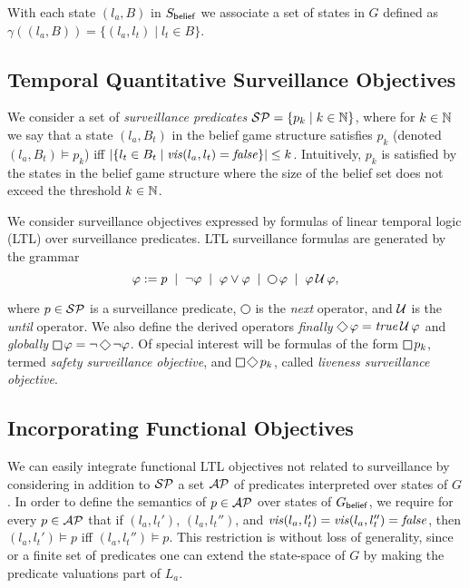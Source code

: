  
\begin{example}
\end{example}


With each state $(l_a,B)$ in $S_{\mathsf{belief}}$ we associate a set of states in $G$ defined as $\gamma((l_a,B)) = \{(l_a,l_t) \mid l_t \in B\}$.

\subsection{Temporal Quantitative Surveillance Objectives}

We consider a set of \emph{surveillance predicates} $\mathcal{SP} = \{p_k \mid k \in \mathbb{N}\}$, where for $k \in \mathbb{N}$ we say that a state $(l_a,B_t)$ in the belief game structure satisfies $p_k$ (denoted $(l_a,B_t) \models p_k$) iff 
$|\{l_t \in B_t \mid \mathit{vis}(l_a,l_t)  = \mathit{false} \}| \leq k$. Intuitively, $p_k$ is satisfied by the states in the belief game structure where the size of the belief set does not exceed the threshold $k \in \mathbb{N}$.

We consider surveillance objectives expressed by formulas of linear temporal logic (LTL) over surveillance predicates. LTL surveillance formulas are generated by the grammar
\[\varphi := p \;\mid\; \neg \varphi \;\mid\; \varphi \vee \varphi \;\mid\; \LTLnext  \varphi  \;\mid\; \varphi \LTLuntil \varphi,\]

where $p \in \mathcal{SP}$ is a surveillance predicate, $\LTLnext$ is the \emph{next} operator, and $\operatorname{\mathcal{U}}$ is the \emph{until} operator. We also define the derived operators 
\emph{finally} $\LTLfinally \varphi = \true \LTLuntil \varphi$ and 
\emph{globally} $\LTLglobally \varphi = \neg \LTLfinally \neg \varphi$.
Of special interest will be formulas of the form $\LTLglobally p_k$, termed \emph{safety surveillance objective}, and $\LTLglobally\LTLfinally p_k$, called \emph{liveness surveillance objective}.


\begin{example}
\end{example}


\subsection{Incorporating Functional Objectives}
We can easily integrate functional LTL objectives not related to surveillance by considering in addition to $\mathcal{SP}$ a set $\mathcal{AP}$ of predicates interpreted over states of $G$. In order to define the semantics of $p \in \mathcal{AP}$ over states of $G_{\mathsf{belief}}$, we require for every $p \in \mathcal{AP}$ that if $(l_a,l_t')$, $(l_a,l_t'')$, and $\mathit{vis}(l_a,l_t') = \mathit{vis}(l_a,l_t'') = \mathit{false}$, then $(l_a,l_t') \models p$ iff $(l_a,l_t'') \models p$. This restriction is without loss of generality, since or a finite set of predicates one can extend the state-space of $G$ by making the predicate valuations part of $L_a$.

\begin{example}
\end{example}
